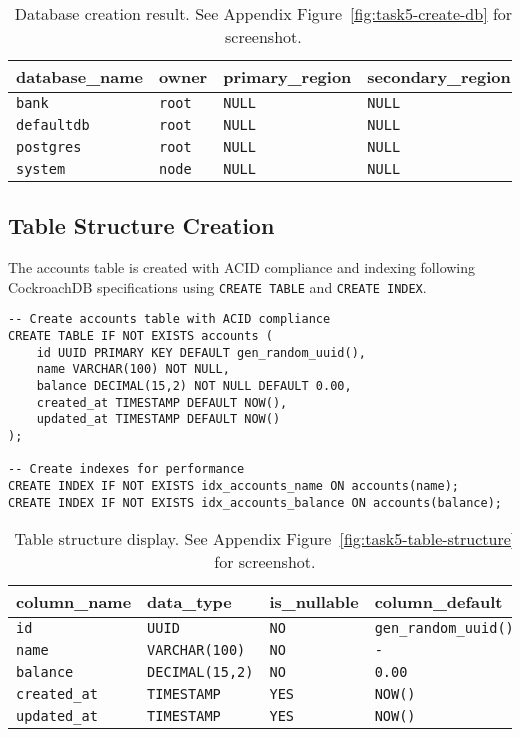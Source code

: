 \begin{table}[H]
  \centering
  \begin{tabular}{|l|l|l|l|}
    \hline
    \textbf{database\_name} & \textbf{owner} & \textbf{primary\_region} & \textbf{secondary\_region} \\
    \hline
    \texttt{bank} & \texttt{root} & \texttt{NULL} & \texttt{NULL} \\
    \texttt{defaultdb} & \texttt{root} & \texttt{NULL} & \texttt{NULL} \\
    \texttt{postgres} & \texttt{root} & \texttt{NULL} & \texttt{NULL} \\
    \texttt{system} & \texttt{node} & \texttt{NULL} & \texttt{NULL} \\
    \hline
  \end{tabular}
  \caption{Database creation result. See Appendix Figure~\ref{fig:task5-create-db} for screenshot.}
\end{table}

\subsection{Table Structure Creation}
The accounts table is created with ACID compliance and indexing following CockroachDB specifications using \texttt{CREATE TABLE} and \texttt{CREATE INDEX}.

\begin{verbatim}
-- Create accounts table with ACID compliance
CREATE TABLE IF NOT EXISTS accounts (
    id UUID PRIMARY KEY DEFAULT gen_random_uuid(),
    name VARCHAR(100) NOT NULL,
    balance DECIMAL(15,2) NOT NULL DEFAULT 0.00,
    created_at TIMESTAMP DEFAULT NOW(),
    updated_at TIMESTAMP DEFAULT NOW()
);

-- Create indexes for performance
CREATE INDEX IF NOT EXISTS idx_accounts_name ON accounts(name);
CREATE INDEX IF NOT EXISTS idx_accounts_balance ON accounts(balance);
\end{verbatim}

\begin{table}[H]
  \centering
  \begin{tabular}{|l|l|l|l|}
    \hline
    \textbf{column\_name} & \textbf{data\_type} & \textbf{is\_nullable} & \textbf{column\_default} \\
    \hline
    \texttt{id} & \texttt{UUID} & \texttt{NO} & \texttt{gen\_random\_uuid()} \\
    \texttt{name} & \texttt{VARCHAR(100)} & \texttt{NO} & \texttt{-} \\
    \texttt{balance} & \texttt{DECIMAL(15,2)} & \texttt{NO} & \texttt{0.00} \\
    \texttt{created\_at} & \texttt{TIMESTAMP} & \texttt{YES} & \texttt{NOW()} \\
    \texttt{updated\_at} & \texttt{TIMESTAMP} & \texttt{YES} & \texttt{NOW()} \\
    \hline
  \end{tabular}
  \caption{Table structure display. See Appendix Figure~\ref{fig:task5-table-structure} for screenshot.}
\end{table}

